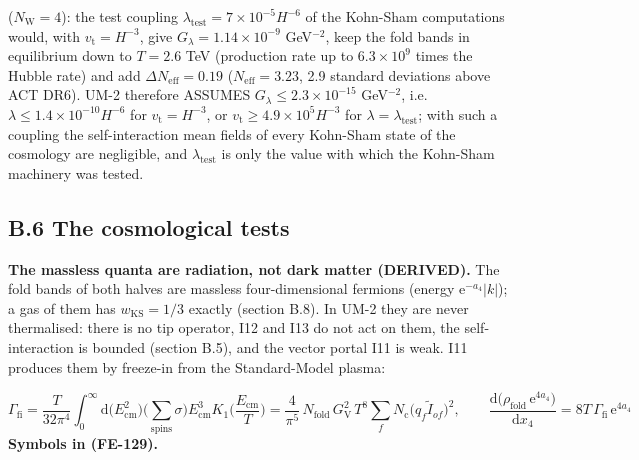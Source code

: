 \documentclass[
  10pt,
]{article}
\begin{document}
(\(N_{\mathrm{W}} = 4\)): the test coupling
\(\lambda_{\mathrm{test}} = 7\times10^{-5}H^{-6}\) of the Kohn-Sham
computations would, with \(v_{\mathrm{t}} = H^{-3}\), give
\(G_\lambda = 1.14\times10^{-9}\) GeV\(^{-2}\), keep the fold bands in
equilibrium down to \(T = 2.6\) TeV (production rate up to
\(6.3\times10^9\) times the Hubble rate) and add
\(\Delta N_{\mathrm{eff}} = 0.19\) (\(N_{\mathrm{eff}} = 3.23\), 2.9
standard deviations above ACT DR6). UM-2 therefore ASSUMES
\(G_\lambda \le 2.3\times10^{-15}\) GeV\(^{-2}\),
i.e.~\(\lambda \le 1.4\times10^{-10}H^{-6}\) for
\(v_{\mathrm{t}} = H^{-3}\), or
\(v_{\mathrm{t}} \ge 4.9\times10^5H^{-3}\) for
\(\lambda = \lambda_{\mathrm{test}}\); with such a coupling the
self-interaction mean fields of every Kohn-Sham state of the cosmology
are negligible, and \(\lambda_{\mathrm{test}}\) is only the value with
which the Kohn-Sham machinery was tested.

\hypertarget{b.6-the-cosmological-tests}{%
\subsection*{B.6 The cosmological
tests}\label{b.6-the-cosmological-tests}}

\textbf{The massless quanta are radiation, not dark matter (DERIVED).}
The fold bands of both halves are massless four-dimensional fermions
(energy \(\mathrm{e}^{-a_4}\lvert k\rvert\)); a gas of them has
\(w_{\mathrm{KS}} = 1/3\) exactly (section B.8). In UM-2 they are never
thermalised: there is no tip operator, I12 and I13 do not act on them,
the self-interaction is bounded (section B.5), and the vector portal I11
is weak. I11 produces them by freeze-in from the Standard-Model plasma:

\[
\Gamma_{\mathrm{fi}} =
 \frac{T}{32\pi^4}\int_0^\infty\mathrm{d}\big(E_{\mathrm{cm}}^2\big)\Big(\sum_{\text{spins}}\sigma
 \Big)E_{\mathrm{cm}}^3
 K_1\Big(\frac{E_{\mathrm{cm}}}{T}\Big) =
 \frac{4}{\pi^5}\,N_{\mathrm{fold}}\,G_{\mathrm{V}}^2\,T^8\sum_fN_{\mathrm{c}}\big(q_f\tilde I_{of}\big)^2,
\qquad \frac{\mathrm{d}\big(\rho_{\mathrm{fold}}\,\mathrm{e}^{4a_4}\big)}{\mathrm{d}x_4} =
 8T\,\Gamma_{\mathrm{fi}}\,\mathrm{e}^{4a_4} \tag{FE-129}
\] \textbf{Symbols in (FE-129).}
\end{document}
